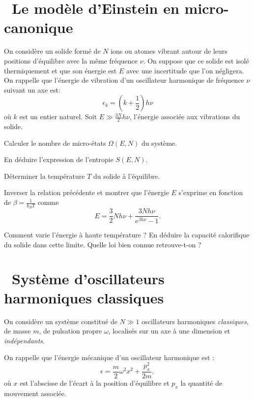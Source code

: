 \documentclass[utf8, 11pt]{feuille}
\begin{document}




\section{\medium~Le modèle d'Einstein en micro-canonique}

On considère un solide formé de $N$ ions ou atomes vibrant autour de leurs positions d'équilibre avec la même fréquence $\nu$. On suppose que ce solide est isolé thermiquement et que son énergie est $E$ avec une incertitude que l'on négligera. On rappelle que l'énergie de vibration d'un oscillateur harmonique de fréquence $\nu$ suivant un axe est:
$$
\epsilon_k=(k+\frac{1}{2}) h \nu
$$
où $k$ est un entier naturel. Soit $E \gg \frac{3N}{2} h \nu$, l'énergie associée aux vibrations du solide.

\question
Calculer le nombre de micro-états $\Omega(E,N)$ du système.

\question
En déduire l'expression de l'entropie $S(E,N)$.

\question
Déterminer la température $T$ du solide à l'équilibre. 

\question
Inverser la relation précédente et montrer que l'énergie $E$ s'exprime en fonction de $\beta=\frac{1}{k_BT}$ comme
$$
E=\frac{3}{2} N h \nu + \frac{3Nh \nu}{e^{\beta h \nu}-1}. \nonumber
$$

\question
Comment varie l'énergie à haute température ? En déduire la capacité calorifique du solide dans cette limite. Quelle loi bien connue retrouve-t-on ?



\section{\medium~Système d'oscillateurs harmoniques classiques}

On considère un système constitué de $N \gg 1$ oscillateurs harmoniques {\it classiques}, de masse $m$, de pulsation propre $\omega$, localisés sur un axe à une dimension et {\it indépendants}.

On rappelle que l'énergie mécanique d'un oscillateur harmonique est :
$$
\epsilon=\frac{m}{2}\omega^2 x^2+\frac{p_x^2}{2m} , \nonumber
$$
où $x$ est l'abscisse de l'écart à la position d'équilibre et $p_x$ la quantité de mouvement associée.
\end{document}

